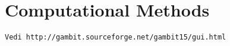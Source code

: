 \chapter{Computational Methods}

\begin{verbatim}
Vedi http://gambit.sourceforge.net/gambit15/gui.html
\end{verbatim}
